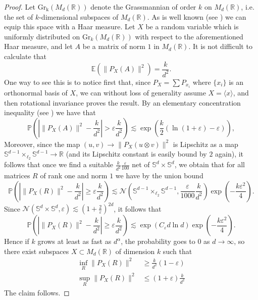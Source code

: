 \documentclass[11pt, a4paper, reqno]{elsarticle}
\theoremstyle{definition}
\theoremstyle{remark}
\begin{document}
\begin{proof}
    Let $\mathrm{Gr_k}(M_d(\mathbb{R}))$ denote the Grassmannian of order $k$ on $M_d(\mathbb R)$, i.e. the set
    of $k$-dimensional subspaces of $M_d(\mathbb R)$. As is well known
    (see \cite[Proposition 7.2]{Eaton2023}) we can equip this space
    with a Haar measure. 
    Let $X$ be a random variable which is uniformly distributed on $\mathrm{Gr}_k(M_d(\mathbb{R}))$ with respect
    to the aforementioned Haar measure, and let $A$
  be a matrix of norm $1$ in $M_d(\mathbb{R}).$
  It is not difficult to calculate that
  \begin{equation*}
      \mathbb E(\|P_X(A)\|^2)=\frac{k}{d^2}.
  \end{equation*}
  One way to see this is to notice first that, since 
  $P_{X}=\sum P_{x_i}$ where $\{x_i\}$ is an orthonormal
  basis of $X$, we can without loss of generality assume
  $X=\langle x\rangle$, and then rotational invariance 
  proves the result.
  By an elementary concentration inequality (see \cite{Dasgupta}) we have that 
  \begin{equation*}
      \mathbb P\left(\left|\|P_X(A)\|^2-\frac k{d^2}\right|>\varepsilon \frac k{d^2}\right)\lesssim \exp\left(\frac k2(\ln(1+\varepsilon)-\varepsilon)\right),
  \end{equation*}
      Moreover, since the map $(u,v)\to \|P_X(u\otimes v)\|^2$
      is Lipschitz as a map $\mathbb{S}^{d-1}\times_{\ell_2}\mathbb{S}^{d-1}\to \mathbb{R}$ (and its Lipschitz constant is
      easily bound by $2$ again), it follows that once we find a suitable $\frac{k}{d^2}\frac{\varepsilon}{100}$ net of $\mathbb{S}^{d}\times \mathbb{S}^d$, we
      obtain that for all matrices $R$ of rank one and norm 
      $1$ we have by the union bound
       \begin{equation*}
      \mathbb P\left(\left|\|P_X(R)\|^2-\frac k{d^2}\right|\ge \varepsilon\frac{k}{d^2}\right)\lesssim \mathcal N\left(\mathbb{S}^{d-1}\times_{\ell_2} \mathbb{S}^{d-1},\frac \varepsilon{1000}\frac{k}{d^2}\right)\exp\left(-\frac{k\varepsilon^2}{4}\right).
      \end{equation*}
      Since $\mathcal N\left( \mathbb{S}^d\times \mathbb{S}^d,\varepsilon \right)\lesssim (1+\frac 2\varepsilon)^{2d}$,
       it follows that
       \begin{equation*}
            \mathbb P\left(\left|\|P_X(R)\|^2-\frac k{d^2}\right|\ge \varepsilon\frac{k}{d^2}\right)\lesssim \exp(C_\varepsilon d\ln d)
            \exp\left(-\frac{k\varepsilon^2}{4}\right).
       \end{equation*}
       Hence if $k$ grows at least as fast as $d^\alpha$, the probability goes to $0$ as $d\to \infty$, so
      there exist subspaces $X\subset M_d(\mathbb{R})$ of dimension
      $k$ such that 
      \begin{align*}
          \inf_{R}\|P_X(R)\|^2&\ge \frac k{d^2} (1-\varepsilon)\\
          \sup_{R}\|P_X(R)\|^2&\le (1+\varepsilon)\frac k{d^2}
      \end{align*}
      The claim follows.
\end{proof}
\end{document}
